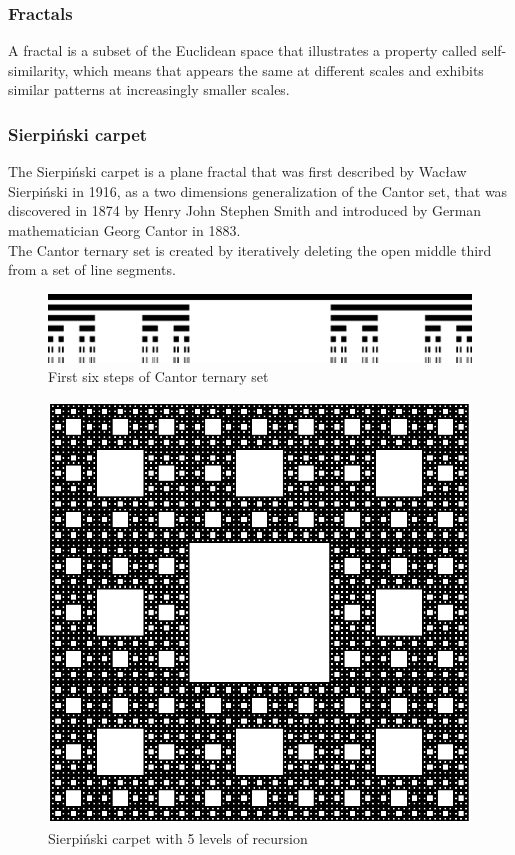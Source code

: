 \documentclass{article}
\begin{document}
\subsubsection{Fractals}
A fractal is a subset of the Euclidean space that illustrates a property called self-similarity, which means that appears the same at different scales and exhibits similar patterns at increasingly smaller scales. 

\subsubsection{Sierpiński carpet}
The Sierpiński carpet is a plane fractal that was first described by Wacław Sierpiński in 1916, as a two dimensions generalization of the Cantor set, that was discovered in 1874 by Henry John Stephen Smith and introduced by German mathematician Georg Cantor in 1883.\\

The Cantor ternary set is created by iteratively deleting the open middle third from a set of line segments.

\begin{figure}[h]
    \includegraphics[width=\textwidth]{./cantor.png}
    \caption{First six steps of Cantor ternary set}
\end{figure}
\begin{figure}[h]
    \centering
    \includegraphics[scale=0.4]{./sierpinski.png}
    \caption{Sierpiński carpet with 5 levels of recursion}
\end{figure}
\vfill
\end{document}

